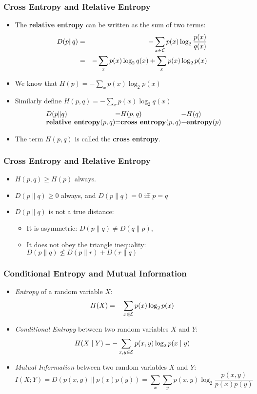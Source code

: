 \begin{frame}
\frametitle{Cross Entropy and Relative Entropy}
\begin{itemize}[<+->]
\item The {\bf relative entropy} can be written as the sum of two terms:
\begin{eqnarray*}
D(p \| q) & = & - \sum_{x \in {\cal E}} p(x) \log_2 \frac{p(x)}{q(x)} \\
& = & - \sum_{x} p(x) \log_2 q(x) + \sum_{x} p(x) \log_2 p(x) 
\end{eqnarray*}
\item We know that $H(p) = - \sum_{x} p(x) \log_2 p(x)$
\item Similarly define $H(p,q) = - \sum_{x} p(x) \log_2 q(x)$
\[
\begin{array}{l@{}c@{}l@{}c@{}l@{}}
D(p \| q) & = & H(p,q) & - & H(q) \\
\textbf{relative entropy}(p,q) & = & \textbf{cross entropy}(p,q) & - & \textbf{entropy}(p) 
\end{array}
\]
\item The term $H(p,q)$ is called the {\bf cross entropy}.
\end{itemize}

\end{frame}

\begin{frame}
\frametitle{Cross Entropy and Relative Entropy}
\begin{itemize}[<+->]
\item $H(p,q) \geq H(p)$ always.
\item $D(p \| q) \geq 0$ always, and $D(p \| q) = 0$ iff $p = q$
\item $D(p \| q)$ is not a true distance: 
  \begin{itemize}
  \item It is asymmetric: $D(p \| q) \neq D(q \| p)$, 
  \item It does not obey the triangle inequality: $D(p \| q) \nleq D(p \| r) + D(r \| q)$
  \end{itemize}
\end{itemize}

\end{frame}

\begin{frame}
\frametitle{Conditional Entropy and Mutual Information}
\begin{itemize}[<+->]
\item {\it Entropy} of a random variable $X$:
\[ H(X) = - \sum_{x \in {\cal E}} p(x) \log_2 p(x) \]
\item {\it Conditional Entropy} between two random variables $X$ and $Y$:
\[ H(X \mid Y) = - \sum_{x,y \in {\cal E}} p(x,y) \log_2 p(x
\mid y) \]
\item {\it Mutual Information} between two random variables $X$ and $Y$:
\[ I(X;Y) = D(p(x,y) \| p(x)p(y)) = \sum_x \sum_y p(x,y) \log_2
\frac{p(x,y)}{p(x)p(y)} \]
\end{itemize}

\end{frame}

